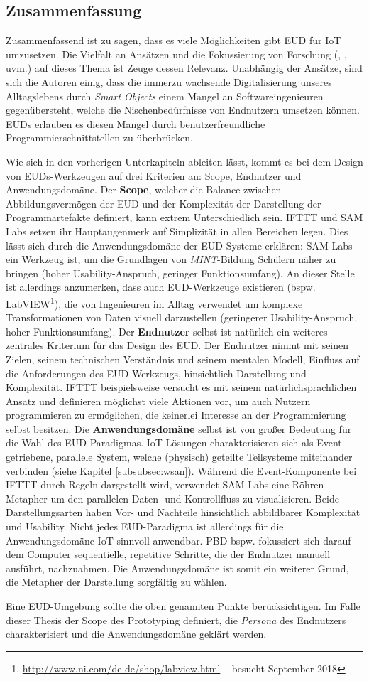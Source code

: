 \subsection{Zusammenfassung}
Zusammenfassend ist zu sagen, dass es viele Möglichkeiten gibt \ac{EUD} für \ac{IoT} umzusetzen. Die Vielfalt an Ansätzen und die Fokussierung von Forschung (\cite{2015iseud}, \cite{2017iseud}, uvm.) auf dieses Thema ist Zeuge dessen Relevanz. Unabhängig der Ansätze, sind sich die Autoren einig, dass die immerzu wachsende Digitalisierung unseres Alltagslebens durch \textit{Smart Objects} einem Mangel an Softwareingenieuren gegenübersteht, welche die Nischenbedürfnisse von Endnutzern umsetzen können. \acp{EUD} erlauben es diesen Mangel durch benutzerfreundliche Programmierschnittstellen zu überbrücken.

Wie sich in den vorherigen Unterkapiteln ableiten lässt, kommt es bei dem Design von \acp{EUD}-Werkzeugen auf drei Kriterien an: Scope, Endnutzer und Anwendungsdomäne. Der \textbf{Scope}, welcher die Balance zwischen Abbildungsvermögen der \ac{EUD} und der Komplexität der Darstellung der Programmartefakte definiert, kann extrem Unterschiedlich sein. IFTTT und SAM Labs setzen ihr Hauptaugenmerk auf Simplizität in allen Bereichen legen. Dies lässt sich durch die Anwendungsdomäne der \ac{EUD}-Systeme erklären: SAM Labs ein Werkzeug ist, um die Grundlagen von \textit{MINT}-Bildung Schülern näher zu bringen (hoher Usability-Anspruch, geringer Funktionsumfang). An dieser Stelle ist allerdings anzumerken, dass auch \ac{EUD}-Werkzeuge existieren (bspw. LabVIEW\footnote{\url{http://www.ni.com/de-de/shop/labview.html} -- besucht September 2018}), die von Ingenieuren im Alltag verwendet um komplexe Transformationen von Daten visuell darzustellen (geringerer Usability-Anspruch, hoher Funktionsumfang). Der \textbf{Endnutzer} selbst ist natürlich ein weiteres zentrales Kriterium für das Design des \ac{EUD}. Der Endnutzer nimmt mit seinen Zielen, seinem technischen Verständnis und seinem mentalen Modell, Einfluss auf die Anforderungen des \ac{EUD}-Werkzeugs, hinsichtlich Darstellung und Komplexität. IFTTT beispielsweise versucht es mit seinem natürlichsprachlichen Ansatz und definieren möglichst viele Aktionen vor, um auch Nutzern programmieren zu ermöglichen, die keinerlei Interesse an der Programmierung selbst besitzen. Die \textbf{Anwendungsdomäne} selbst ist von großer Bedeutung für die Wahl des \ac{EUD}-Paradigmas. \ac{IoT}-Lösungen charakterisieren sich als Event-getriebene, parallele System, welche (physisch) geteilte Teilsysteme miteinander verbinden (siehe Kapitel \ref{subsubsec:wsan}). Während die Event-Komponente bei IFTTT durch Regeln dargestellt wird, verwendet SAM Labs eine Röhren-Metapher um den parallelen Daten- und Kontrollfluss zu visualisieren. Beide Darstellungsarten haben Vor- und Nachteile hinsichtlich abbildbarer Komplexität und Usability. Nicht jedes \ac{EUD}-Paradigma ist allerdings für die Anwendungsdomäne \ac{IoT} sinnvoll anwendbar. \ac{PBD} bspw. fokussiert sich darauf dem Computer sequentielle, repetitive Schritte, die der Endnutzer manuell ausführt, nachzuahmen. Die Anwendungsdomäne ist somit ein weiterer Grund, die Metapher der Darstellung sorgfältig zu wählen.

Eine \ac{EUD}-Umgebung sollte die oben genannten Punkte berücksichtigen. Im Falle dieser Thesis der Scope des Prototyping definiert, die \textit{Persona} des Endnutzers charakterisiert und die Anwendungsdomäne geklärt werden.
